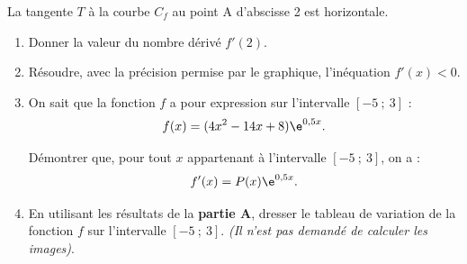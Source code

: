 La tangente $T$ à la courbe $C_f$ au point A d'abscisse 2 est horizontale.

\begin{enumerate}
\item Donner la valeur du nombre dérivé $f'(2)$.

\item Résoudre, avec la précision permise par le graphique, l'inéquation $f'(x) < 0$.

\item On sait que la fonction $f$ a pour expression sur l'intervalle $[-5~;~3]$ :
\[f(x) = (4x^2 - 14x + 8)\e^{0,5x}.\]

Démontrer que, pour tout $x$ appartenant à l'intervalle $[-5~;~3]$, on a :
\[f'(x) = P(x)\e^{0,5x}.\]

\item En utilisant les résultats de la \textbf{partie A}, dresser le tableau de variation de la fonction $f$ sur l'intervalle $[-5~;~3]$. \textit{(Il n'est pas demandé de calculer les images)}.
\end{enumerate}
